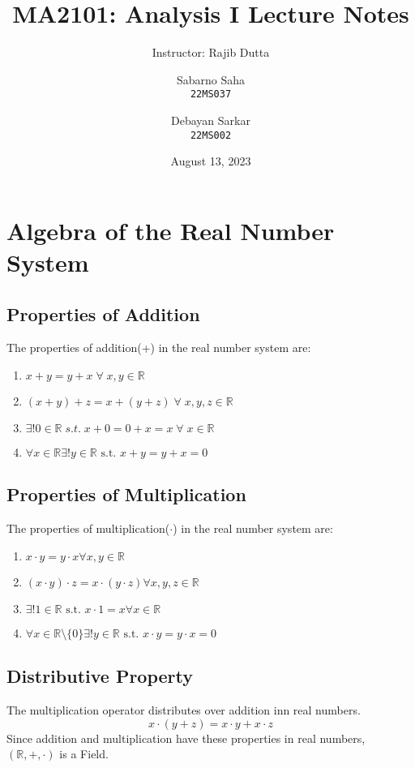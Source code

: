 \documentclass{scrartcl}
\newcommand{\rn}{\mathbb{R}}
\begin{document}
\title{MA2101: Analysis I Lecture Notes}
\subtitle{Instructor: Rajib Dutta}
\author{Sabarno Saha \\ \texttt{22MS037}\and Debayan Sarkar \\ \texttt{22MS002}}
\date{August 13, 2023}
    \maketitle
    \section{Algebra of the Real Number System}
    \subsection{Properties of Addition}
    The properties of addition(+) in the real number system are:
    \begin{enumerate}[label={(A\arabic*})]
        \item $x+y=y+x\; \forall \; x,y \in \mathbb{R}$
        \item $(x+y)+z = x+(y+z) \; \forall \; x,y,z \in \mathbb{R}$
        \item $ \exists !0 \in \mathbb{R} \; s.t.\; x+0 =0+x =x \; \forall \; x\in \mathbb{R}$
        \item $ \forall x \in \rn \exists! y \in \rn \text{ s.t. } x + y = y + x = 0$
    \end{enumerate}
    \subsection{Properties of Multiplication}
    The properties of multiplication($\cdot$) in the real number system are:
    \begin{enumerate}[label={(M\arabic*)}]
        \item $x\cdot y = y\cdot x \forall x, y \in \rn$ 
        \item $(x \cdot y)\cdot z = x\cdot (y \cdot z) \forall x, y, z \in \rn$
        \item $\exists ! 1 \in \rn \text{ s.t. } x \cdot 1 = x \forall x \in \rn$
        \item $\forall x\in \rn \setminus \{0\} \exists ! y \in \rn \text{ s.t. } x\cdot y = y \cdot x = 0$
    \end{enumerate}
    \subsection{Distributive Property}
    The multiplication operator distributes over addition inn real numbers.
    $$x \cdot (y + z) = x \cdot y + x \cdot z$$
    Since addition and multiplication have these properties in real numbers, $(\rn, +, \cdot)$ is a Field.
\end{document}
